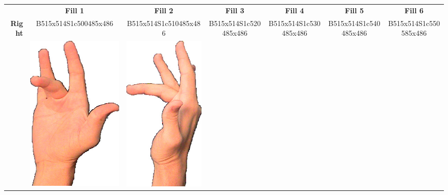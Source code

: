 \documentclass{article}
\begin{document}
\begin{center}
\begin{tabular}{r*{6}{c}}
&\textbf{Fill 1}&\textbf{Fill 2}&\textbf{Fill 3}&\textbf{Fill 4}&\textbf{Fill 5}&\textbf{Fill 6}\\
\multirow{2}{*}{\textbf{Right}}&
B515x514S1c500485x486&
B515x514S1c510485x486&
B515x514S1c520485x486&
B515x514S1c530485x486&
B515x514S1c540485x486&
B515x514S1c550585x486\\
&
\includegraphics[scale=0.1]{images/08-03-1.jpg}&
\includegraphics[scale=0.1]{images/08-03-2.jpg}&

\end{tabular}
\end{center}
\end{document}
